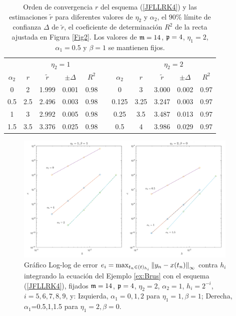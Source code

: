 \begin{table}[htb]
	\centering
	\caption{
		Orden de convergencia $r$ del esquema (\ref{JFLLRK4}) y las estimaciones $\widetilde{r}$ para diferentes valores de $\eta_2$ y $\alpha_2$, el $90\%$ límite de confianza $\Delta$ de $\widetilde{r}$, el coeficiente de determinación $R^2$ de la recta ajustada en Figura \ref{Fig2}. Los valores de $\mathfrak{m}=14$, $\mathfrak{p}=4$, $\eta_1=2$, $\alpha_1=0.5$ y $\beta=1$ se mantienen fijos. }
	\begin{adjustbox}{width=0.8\columnwidth,center}
		\begin{tabular}{ c  c c c c  c  c c c c c}
			\hline
			& \multicolumn{4}{c}{$\eta_2=1$} & & & \multicolumn{4}{c}{$\eta_2=2$} \\
			\cline{2-5} \cline{8-11}
			$\alpha_2$ & $r$ & $\widetilde{r}$ & $\pm\varDelta$ & $R^2$ & & $\alpha_2$ & $r$ & $\widetilde{r}$ & $\pm\varDelta$ & $R^2$ \\
			\hline
			0 & 2 & 1.999 & 0.001 & 0.98 & & 0 & 3 & 3.000 & 0.002 & 0.97 \\
			0.5 & 2.5 & 2.496 & 0.003 & 0.98 & & 0.125 & 3.25 & 3.247 & 0.003 & 0.97 \\
			1 & 3 & 2.992 & 0.005 & 0.98 & & 0.25 & 3.5 & 3.487 & 0.013 & 0.97 \\
			1.5 & 3.5 & 3.376 & 0.025 & 0.98 & & 0.5 & 4 & 3.986 & 0.029 & 0.97 \\
			\hline
		\end{tabular}
	\end{adjustbox}
	\label{tab:out}
\end{table}


\begin{figure}[htb]
	\centering
	\includegraphics[width=0.95\textwidth]{Graphics/lldp-fj/in_new.png}
	\caption{Gráfico Log-log de error $e_i=\max_{t_n\in(t)_{h_i}}\left\lVert y_n-x(t_n) \right\rVert_\infty$ contra $h_i$ integrando la ecuación del Ejemplo \ref{ex:Brus} con el esquema (\ref{JFLLRK4}), fijados $\mathfrak{m}=14$, $\mathfrak{p}=4$, $\eta_2=2$, $\alpha_2=1$, $h_i=2^{-i}$, $i=5,6,7,8,9$, y: Izquierda, $\alpha_1=0,1,2$ para $\eta_1=1,\beta=1$; Derecha, $\alpha_1$=0.5,1,1.5 para $\eta_1=2,\beta=0$.}
	\label{Fig3}
\end{figure}


